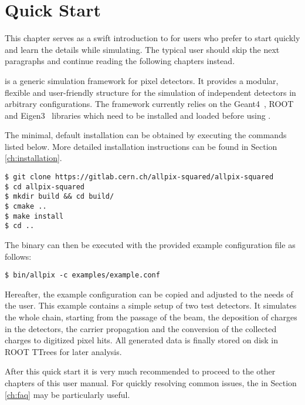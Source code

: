 \chapter{Quick Start}
\label{ch:quickstart}
This chapter serves as a swift introduction to \apsq for users who prefer to start quickly and learn the details while simulating.
The typical user should skip the next paragraphs and continue reading the following chapters instead.

\apsq is a generic simulation framework for pixel detectors.
It provides a modular, flexible and user-friendly structure for the simulation of independent detectors in arbitrary configurations.
The framework currently relies on the Geant4~\cite{geant4}, ROOT~\cite{root} and Eigen3~\cite{eigen3} libraries which need to be installed and loaded before using \apsq.

The minimal, default installation can be obtained by executing the commands listed below.
More detailed installation instructions can be found in Section \ref{ch:installation}.

\begin{verbatim}
$ git clone https://gitlab.cern.ch/allpix-squared/allpix-squared
$ cd allpix-squared
$ mkdir build && cd build/
$ cmake ..
$ make install
$ cd ..
\end{verbatim}
The binary can then be executed with the provided example configuration file as follows:
\begin{verbatim}
$ bin/allpix -c examples/example.conf
\end{verbatim}

Hereafter, the example configuration can be copied and adjusted to the needs of the user.
This example contains a simple setup of two test detectors.
It simulates the whole chain, starting from the passage of the beam, the deposition of charges in the detectors, the carrier propagation and the conversion of the collected charges to digitized pixel hits.
All generated data is finally stored on disk in ROOT TTrees for later analysis.

After this quick start it is very much recommended to proceed to the other chapters of this user manual.
For quickly resolving common issues, the  in Section \ref{ch:faq} may be particularly useful.
